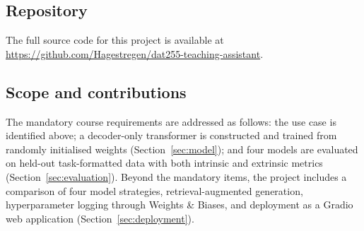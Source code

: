 \subsection*{Repository}

The full source code for this project is available at
\url{https://github.com/Hagestregen/dat255-teaching-assistant}.

\subsection*{Scope and contributions}

The mandatory course requirements are addressed as follows: the use case is identified above;
a decoder-only transformer is constructed and trained from randomly initialised weights
(Section~\ref{sec:model}); and four models are evaluated on held-out task-formatted data with
both intrinsic and extrinsic metrics (Section~\ref{sec:evaluation}). Beyond the mandatory
items, the project includes a comparison of four model strategies, retrieval-augmented
generation, hyperparameter logging through Weights \& Biases, and deployment as a Gradio web
application (Section~\ref{sec:deployment}).
